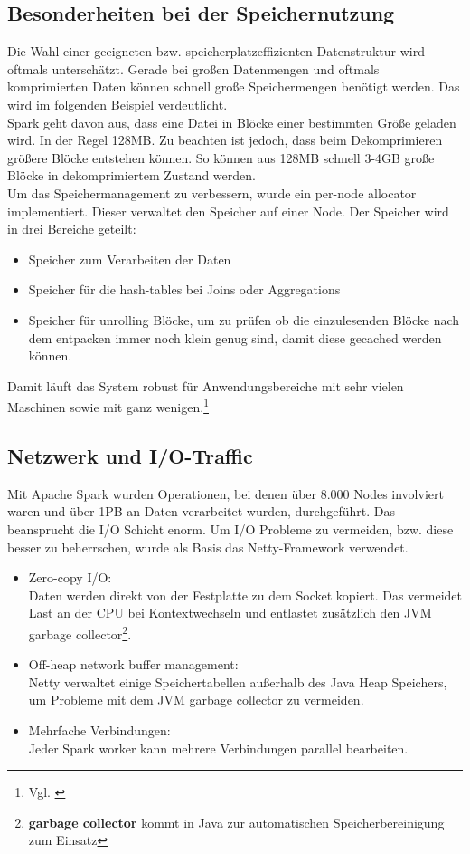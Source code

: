 \subsection{Besonderheiten bei der Speichernutzung}
Die Wahl einer geeigneten bzw. speicherplatzeffizienten Datenstruktur wird oftmals unterschätzt. Gerade bei großen Datenmengen und oftmals komprimierten Daten können schnell große Speichermengen benötigt werden. Das wird im folgenden Beispiel verdeutlicht.\\
Spark geht davon aus, dass eine Datei in Blöcke einer bestimmten Größe geladen wird. In der Regel 128MB. Zu beachten ist jedoch, dass beim Dekomprimieren größere Blöcke entstehen können. So können aus 128MB schnell 3-4GB große Blöcke in dekomprimiertem Zustand werden. \\ 

\noindent
Um das Speichermanagement zu verbessern, wurde ein per-node allocator implementiert. Dieser verwaltet den Speicher auf einer Node. 
Der Speicher wird in drei Bereiche geteilt:
\begin{itemize}
	\item Speicher zum Verarbeiten der Daten
	\item Speicher für die hash-tables bei Joins oder Aggregations
	\item Speicher für \glqq{}unrolling\grqq{} Blöcke, um zu prüfen ob die einzulesenden Blöcke nach dem entpacken immer noch klein genug sind, damit diese gecached werden können.
\end{itemize}
\noindent
Damit läuft das System robust für Anwendungsbereiche mit sehr vielen Maschinen sowie mit ganz wenigen.\footnote{Vgl. \cite{ADD+15}}

\subsection{Netzwerk und I/O-Traffic}

Mit Apache Spark wurden Operationen, bei denen über 8.000 Nodes involviert waren und über 1PB an Daten verarbeitet wurden, durchgeführt. Das beansprucht die I/O Schicht enorm.
Um I/O Probleme zu vermeiden, bzw. diese besser zu beherrschen, wurde als Basis das Netty-Framework verwendet.
\begin{itemize}
	\item Zero-copy I/O:\\
	Daten werden direkt von der Festplatte zu dem Socket kopiert. Das vermeidet Last an der CPU bei Kontextwechseln und entlastet zusätzlich den JVM garbage collector\footnote{\textbf{garbage collector} kommt in Java zur automatischen Speicherbereinigung zum Einsatz}.
	\item Off-heap network buffer management:\\
	Netty verwaltet einige Speichertabellen außerhalb des Java Heap Speichers, um Probleme mit dem JVM garbage collector zu vermeiden.
	\item Mehrfache Verbindungen:\\
	Jeder Spark worker kann mehrere Verbindungen parallel bearbeiten.
\end{itemize}



